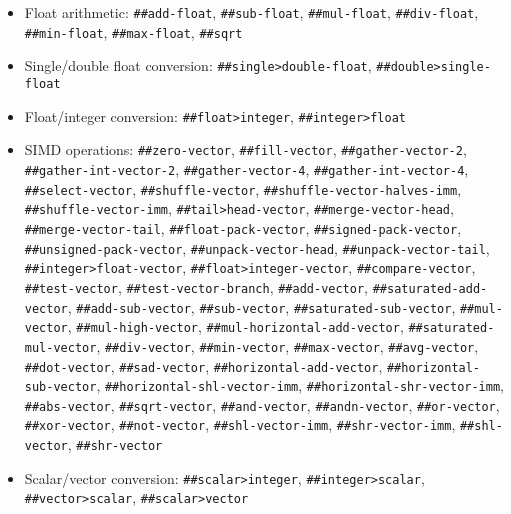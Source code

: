 \begin{itemize}
\item
\begin{flushleft}
Float arithmetic:
\Verb|##add-float|,
\Verb|##sub-float|,
\Verb|##mul-float|,
\Verb|##div-float|,
\Verb|##min-float|,
\Verb|##max-float|,
\Verb|##sqrt|
\end{flushleft}

\item
\begin{flushleft}
Single/double float conversion:
\Verb|##single>double-float|,
\Verb|##double>single-float|
\end{flushleft}

\item
\begin{flushleft}
Float/integer conversion:
\Verb|##float>integer|,
\Verb|##integer>float|
\end{flushleft}

\item
\begin{flushleft}
SIMD operations:
\Verb|##zero-vector|,
\Verb|##fill-vector|,
\Verb|##gather-vector-2|,
\Verb|##gather-int-vector-2|,
\Verb|##gather-vector-4|,
\Verb|##gather-int-vector-4|,
\Verb|##select-vector|,
\Verb|##shuffle-vector|,
\Verb|##shuffle-vector-halves-imm|,
\Verb|##shuffle-vector-imm|,
\Verb|##tail>head-vector|,
\Verb|##merge-vector-head|,
\Verb|##merge-vector-tail|,
\Verb|##float-pack-vector|,
\Verb|##signed-pack-vector|,
\Verb|##unsigned-pack-vector|,
\Verb|##unpack-vector-head|,
\Verb|##unpack-vector-tail|,
\Verb|##integer>float-vector|,
\Verb|##float>integer-vector|,
\Verb|##compare-vector|,
\Verb|##test-vector|,
\Verb|##test-vector-branch|,
\Verb|##add-vector|,
\Verb|##saturated-add-vector|,
\Verb|##add-sub-vector|,
\Verb|##sub-vector|,
\Verb|##saturated-sub-vector|,
\Verb|##mul-vector|,
\Verb|##mul-high-vector|,
\Verb|##mul-horizontal-add-vector|,
\Verb|##saturated-mul-vector|,
\Verb|##div-vector|,
\Verb|##min-vector|,
\Verb|##max-vector|,
\Verb|##avg-vector|,
\Verb|##dot-vector|,
\Verb|##sad-vector|,
\Verb|##horizontal-add-vector|,
\Verb|##horizontal-sub-vector|,
\Verb|##horizontal-shl-vector-imm|,
\Verb|##horizontal-shr-vector-imm|,
\Verb|##abs-vector|,
\Verb|##sqrt-vector|,
\Verb|##and-vector|,
\Verb|##andn-vector|,
\Verb|##or-vector|,
\Verb|##xor-vector|,
\Verb|##not-vector|,
\Verb|##shl-vector-imm|,
\Verb|##shr-vector-imm|,
\Verb|##shl-vector|,
\Verb|##shr-vector|
\end{flushleft}

\item
\begin{flushleft}
Scalar/vector conversion:
\Verb|##scalar>integer|,
\Verb|##integer>scalar|,
\Verb|##vector>scalar|,
\Verb|##scalar>vector|
\end{flushleft}


\end{itemize}
